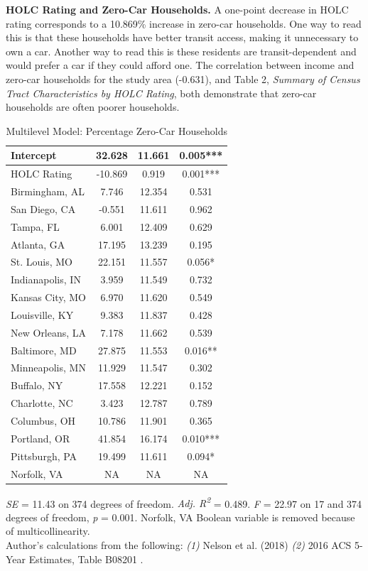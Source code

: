 \documentclass[paper=letter, fontsize=12pt]{scrartcl} %
\begin{document}
	\begin{table}
		\textbf{HOLC Rating and Zero-Car Households.} A one-point decrease in HOLC rating corresponds to a 10.869\% increase in zero-car households. One way to read this is that these households have better transit access, making it unnecessary to own a car. Another way to read this is these residents are transit-dependent and would prefer a car if they could afford one. The correlation between income and zero-car households for the study area (-0.631), and Table 2, \textit{Summary of Census Tract Characteristics by HOLC Rating}, both demonstrate that zero-car households are often poorer households.
		\caption{Multilevel Model: Percentage Zero-Car Households}
		\begin{center}
			\begin{tabular}{|| l | c c c ||}
				\hline
				Intercept & 32.628 & 11.661 & 0.005***\\ 
				\hline 
				HOLC Rating & -10.869 & 0.919 & 0.001***\\ 
				\hline 
				Birmingham, AL & 7.746 & 12.354 & 0.531\\ 
				\hline 
				San Diego, CA & -0.551 & 11.611 & 0.962\\ 
				\hline 
				Tampa, FL & 6.001 & 12.409 & 0.629\\ 
				\hline 
				Atlanta, GA & 17.195 & 13.239 & 0.195\\ 
				\hline 
				St. Louis, MO & 22.151 & 11.557 & 0.056*\\ 
				\hline 
				Indianapolis, IN & 3.959 & 11.549 & 0.732\\ 
				\hline 
				Kansas City, MO & 6.970 & 11.620 & 0.549\\ 
				\hline 
				Louisville, KY & 9.383 & 11.837 & 0.428\\ 
				\hline 
				New Orleans, LA & 7.178 & 11.662 & 0.539\\ 
				\hline 
				Baltimore, MD & 27.875 & 11.553 & 0.016**\\ 
				\hline 
				Minneapolis, MN & 11.929 & 11.547 & 0.302\\ 
				\hline 
				Buffalo, NY & 17.558 & 12.221 & 0.152\\ 
				\hline 
				Charlotte, NC & 3.423 & 12.787 & 0.789\\ 
				\hline 
				Columbus, OH & 10.786 & 11.901 & 0.365\\ 
				\hline 
				Portland, OR & 41.854 & 16.174 & 0.010***\\ 
				\hline 
				Pittsburgh, PA & 19.499 & 11.611 & 0.094*\\ 
				\hline 
				Norfolk, VA & NA & NA & NA\\ 
				\hline
			\end{tabular}
		\end{center}
		\textit{SE} = 11.43 on 374 degrees of freedom. \textit{Adj. R\textsuperscript{2}} = 0.489. \textit{F} = 22.97 on 17 and 374 degrees of freedom, \textit{p} = 0.001. Norfolk, VA Boolean variable is removed because of multicollinearity.\\
		Author's calculations from the following: \textit{(1)} Nelson et al. (2018) \cite{richmond} \textit{(2)} 2016 ACS 5-Year Estimates, Table B08201 \cite{acs16}.
	\end{table}
	
\end{document}
